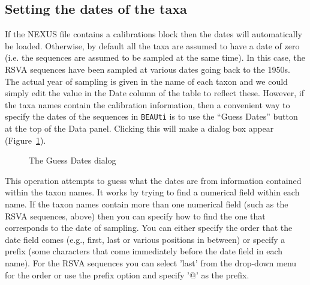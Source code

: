 \documentclass[cup7b, english]{cupbook}
\begin{document}
\subsection{Setting the dates of the taxa}

If the NEXUS file contains a calibrations block then the dates will automatically be loaded. Otherwise, by default 
all the taxa are assumed to have a date of zero (i.e. the sequences are assumed to be sampled at the same time). 
In this case, the RSVA sequences have been sampled at various dates going back to the 1950s. The actual year of 
sampling is given in the name of each taxon and we could simply edit the value in the Date column of the table to
reflect these. However, if the taxa names contain the calibration information, then a convenient way to specify
the dates of the sequences in \texttt{BEAUti} is to use the ``Guess Dates'' button at the top of the Data panel. Clicking this 
will make a dialog box appear (Figure~\ref{fig:figure2}).

\begin{figure}[htbp]
\begin{center}
\leavevmode
{}
\end{center}
\caption{The Guess Dates dialog}
\label{fig:figure2}
\end{figure}

This operation attempts to guess what the dates are from information contained within the taxon names.
It works by trying to find a numerical field within each name. If the taxon names contain more than one
numerical field (such as the RSVA sequences, above) then you can specify how to find the one that
corresponds to the date of sampling. You can either specify the order that the date field comes (e.g.,
first, last or various positions in between) or specify a prefix (some characters that come immediately
before the date field in each name). For the RSVA sequences you can select 'last' from the drop-down menu
for the order or use the prefix option and specify '@' as the prefix.
\end{document}
